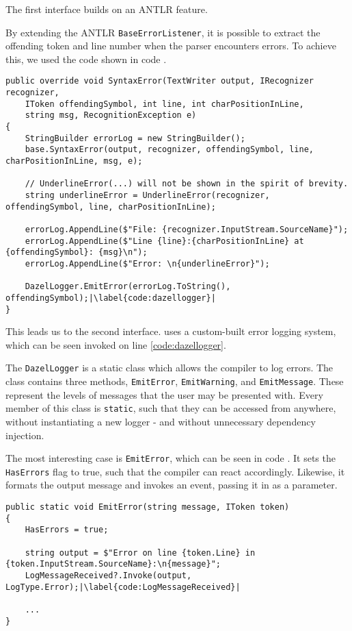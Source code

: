 The first interface builds on an ANTLR feature. 

By extending the ANTLR \texttt{BaseErrorListener}, it is possible to extract the offending token and line number when the parser encounters errors. To achieve this, we used the code shown in code .

\begin{lstlisting}[language=CSharp, caption={The altered \texttt{SyntaxError} method.}, label={lst:SyntaxErrorCode}, escapechar=|]
public override void SyntaxError(TextWriter output, IRecognizer recognizer, 
    IToken offendingSymbol, int line, int charPositionInLine,
    string msg, RecognitionException e)
{
    StringBuilder errorLog = new StringBuilder();
    base.SyntaxError(output, recognizer, offendingSymbol, line, charPositionInLine, msg, e);
    
    // UnderlineError(...) will not be shown in the spirit of brevity.
    string underlineError = UnderlineError(recognizer, offendingSymbol, line, charPositionInLine);

    errorLog.AppendLine($"File: {recognizer.InputStream.SourceName}");
    errorLog.AppendLine($"Line {line}:{charPositionInLine} at {offendingSymbol}: {msg}\n");
    errorLog.AppendLine($"Error: \n{underlineError}");

    DazelLogger.EmitError(errorLog.ToString(), offendingSymbol);|\label{code:dazellogger}|
}
\end{lstlisting}

This leads us to the second interface. \dazel{} uses a custom-built error logging system, which can be seen invoked on line \ref{code:dazellogger}.

The \texttt{DazelLogger} is a static class which allows the \dazel{} compiler to log errors. The class contains three methods, \texttt{EmitError}, \texttt{EmitWarning}, and \texttt{EmitMessage}. These represent the levels of messages that the user may be presented with. Every member of this class is \texttt{static}, such that they can be accessed from anywhere, without instantiating a new logger - and without unnecessary dependency injection.

The most interesting case is \texttt{EmitError}, which can be seen in code . It sets the \texttt{HasErrors} flag to true, such that the \dazel{} compiler can react accordingly. Likewise, it formats the output message and invokes an event, passing it in as a parameter.

\begin{lstlisting}[language=CSharp, caption={\texttt{EmitError} in the \texttt{DazelLogger}.}, label={lst:EmitErrorCode}, escapechar=|]
public static void EmitError(string message, IToken token)
{
    HasErrors = true;
    
    string output = $"Error on line {token.Line} in {token.InputStream.SourceName}:\n{message}";
    LogMessageReceived?.Invoke(output, LogType.Error);|\label{code:LogMessageReceived}|

    ...
}
\end{lstlisting}

